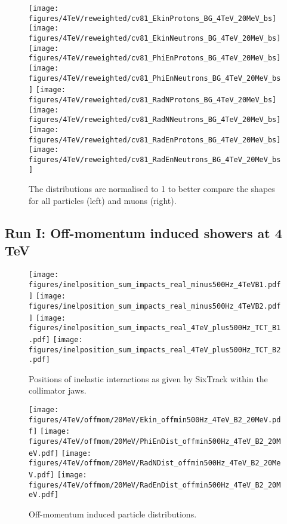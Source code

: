 \begin{figure}
\begin{center}
  \texttt{[image: figures/4TeV/reweighted/cv81\_EkinProtons\_BG\_4TeV\_20MeV\_bs]}
  \texttt{[image: figures/4TeV/reweighted/cv81\_EkinNeutrons\_BG\_4TeV\_20MeV\_bs]}
  \texttt{[image: figures/4TeV/reweighted/cv81\_PhiEnProtons\_BG\_4TeV\_20MeV\_bs]}
  \texttt{[image: figures/4TeV/reweighted/cv81\_PhiEnNeutrons\_BG\_4TeV\_20MeV\_bs]}
  \texttt{[image: figures/4TeV/reweighted/cv81\_RadNProtons\_BG\_4TeV\_20MeV\_bs]}
  \texttt{[image: figures/4TeV/reweighted/cv81\_RadNNeutrons\_BG\_4TeV\_20MeV\_bs]}
  \texttt{[image: figures/4TeV/reweighted/cv81\_RadEnProtons\_BG\_4TeV\_20MeV\_bs]}
  \texttt{[image: figures/4TeV/reweighted/cv81\_RadEnNeutrons\_BG\_4TeV\_20MeV\_bs]}
\end{center}
\vspace{-0.6cm}
 \caption{The distributions are normalised to 1 to better compare the shapes for all particles (left) and muons (right).
   \label{reweighted2}}
 \end{figure}
\subsection{Run I: Off-momentum induced showers at 4 TeV}

\begin{figure}
\begin{center}
\texttt{[image: figures/inelposition\_sum\_impacts\_real\_minus500Hz\_4TeVB1.pdf]}
\texttt{[image: figures/inelposition\_sum\_impacts\_real\_minus500Hz\_4TeVB2.pdf]}
\texttt{[image: figures/inelposition\_sum\_impacts\_real\_4TeV\_plus500Hz\_TCT\_B1.pdf]}
\texttt{[image: figures/inelposition\_sum\_impacts\_real\_4TeV\_plus500Hz\_TCT\_B2.pdf]}
\end{center}
\vspace{-0.6cm}
 \caption{Positions of inelastic interactions as given by SixTrack within the collimator jaws.
  \label{inel4TeVOffmom}}
\end{figure}


\begin{figure}
\begin{center}
  \texttt{[image: figures/4TeV/offmom/20MeV/Ekin\_offmin500Hz\_4TeV\_B2\_20MeV.pdf]}
  \texttt{[image: figures/4TeV/offmom/20MeV/PhiEnDist\_offmin500Hz\_4TeV\_B2\_20MeV.pdf]}
  \texttt{[image: figures/4TeV/offmom/20MeV/RadNDist\_offmin500Hz\_4TeV\_B2\_20MeV.pdf]}
  \texttt{[image: figures/4TeV/offmom/20MeV/RadEnDist\_offmin500Hz\_4TeV\_B2\_20MeV.pdf]}
\end{center}
\vspace{-0.6cm}
 \caption{Off-momentum induced particle distributions.
  \label{offmom4TeV}}
\end{figure}

